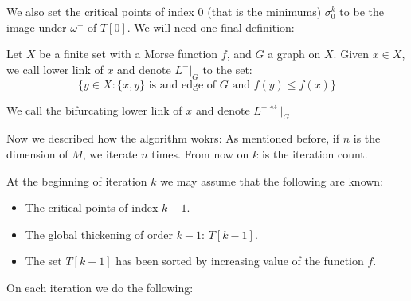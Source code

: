 We also set the critical points of index $0$ (that is the minimums) 
$\sigma_0^k$ to be the image under $\omega^-$
of $T[0]$.
We will need one final definition:

\begin{definition}
    Let $X$ be a finite set with a Morse function $f$, and $G$ a graph on $X$.
    Given $x\in X$, we call lower link of $x$ and denote $L^-\vert_G$ to the 
    set:
    $$
        \{y\in X: \{x,y\} \text{ is and edge of } G \text{ and } f(y)\leq f(x)\}
    $$
    
    We call the bifurcating lower link of $x$ and denote $L^{-\rightsquigarrow}\vert_G$
\end{definition}


Now we described how the algorithm wokrs:
As mentioned before, if $n$ is the dimension of $M$,
we iterate $n$ times. 
From now on $k$ is the iteration count.

At the beginning of iteration $k$ we may assume 
that the following are known:

\begin{itemize}
    \item The critical points of index $k-1$.

    \item The global thickening of order $k-1$: $T[k-1]$.

    \item The set $T[k-1]$ has been sorted by increasing value of the function $f$.
\end{itemize}

On each iteration we do the following:



